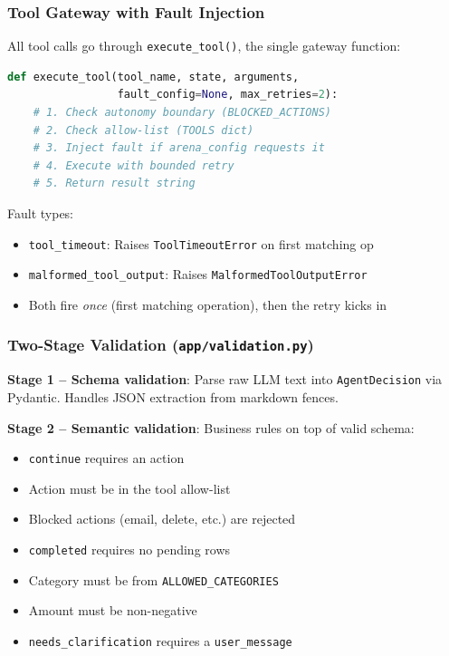 \documentclass[12pt,a4paper]{article}
\begin{document}
\subsubsection{Tool Gateway with Fault Injection}

All tool calls go through \texttt{execute\_tool()}, the single gateway function:

\begin{lstlisting}[language=Python]
def execute_tool(tool_name, state, arguments,
                 fault_config=None, max_retries=2):
    # 1. Check autonomy boundary (BLOCKED_ACTIONS)
    # 2. Check allow-list (TOOLS dict)
    # 3. Inject fault if arena_config requests it
    # 4. Execute with bounded retry
    # 5. Return result string
\end{lstlisting}

Fault types:
\begin{itemize}
  \item \texttt{tool\_timeout}: Raises \texttt{ToolTimeoutError} on first matching op
  \item \texttt{malformed\_tool\_output}: Raises \texttt{MalformedToolOutputError}
  \item Both fire \emph{once} (first matching operation), then the retry kicks in
\end{itemize}

\subsubsection{Two-Stage Validation (\texttt{app/validation.py})}

\textbf{Stage 1 -- Schema validation}: Parse raw LLM text into \texttt{AgentDecision} via Pydantic. Handles JSON extraction from markdown fences.

\textbf{Stage 2 -- Semantic validation}: Business rules on top of valid schema:
\begin{itemize}
  \item \texttt{continue} requires an action
  \item Action must be in the tool allow-list
  \item Blocked actions (email, delete, etc.) are rejected
  \item \texttt{completed} requires no pending rows
  \item Category must be from \texttt{ALLOWED\_CATEGORIES}
  \item Amount must be non-negative
  \item \texttt{needs\_clarification} requires a \texttt{user\_message}
\end{itemize}
\end{document}
